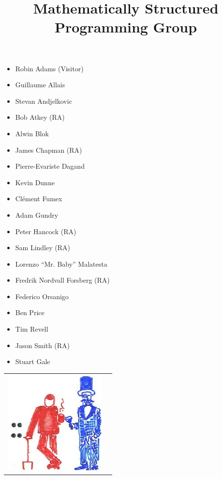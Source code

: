 \documentclass{article}
\begin{document}
\title{\Huge \textbf{Mathematically Structured Programming Group}}

\date{}
\maketitle
\thispagestyle{empty} %

\begin{center}

\begin{multicols}{2}
\large
\begin{itemize}
  \item Robin Adams (Visitor)
  \item Guillaume Allais
  \item Stevan Andjelkovic
  \item Bob Atkey (RA)
  \item Alwin Blok
  \item James Chapman (RA)
  \item Pierre-Evariste Dagand
  \item Kevin Dunne
  \item Cl\'{e}ment Fumex
  \item Adam Gundry
  \item Peter Hancock (RA)
  \item Sam Lindley (RA)
  \item Lorenzo ``Mr. Baby'' Malatesta
  \item Fredrik Nordvall Forsberg (RA)
  \item Federico Orsanigo
  \item Ben Price
  \item Tim Revell
  \item Jason Smith (RA)
  \item Stuart Gale
\end{itemize}
\end{multicols}
\vskip 3cm
\end{center}

\begin{tabular}{l r}
\hskip 1cm
\includegraphics[scale=0.65]{semicolon.png} &
\end{tabular}
\end{document}
